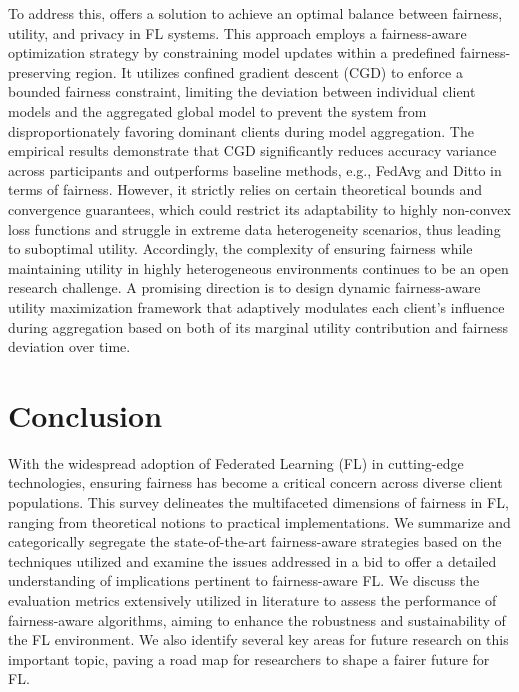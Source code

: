 \documentclass{article}
\begin{document}
To address this, \cite{ACM2024privacy} offers a solution to achieve an optimal balance between fairness, utility, and privacy in FL systems.
This approach employs a fairness-aware optimization strategy by constraining model updates within a predefined fairness-preserving region. It utilizes confined gradient descent (CGD) to enforce a bounded fairness constraint, limiting the deviation between individual client models and the aggregated global model to prevent the system from disproportionately favoring dominant clients during model aggregation. The empirical results demonstrate that CGD significantly reduces accuracy variance across participants and outperforms baseline methods, e.g., 
FedAvg \cite{mcmahan2017communication} and Ditto \cite{li2021dittofairrobustfederated} in terms of fairness. 
However, it strictly relies on certain theoretical bounds and convergence guarantees, which could restrict its adaptability to highly non-convex loss functions and struggle in extreme data heterogeneity scenarios, thus leading to suboptimal utility. Accordingly, the complexity of ensuring fairness while maintaining utility in highly heterogeneous environments continues to be an open research challenge. A promising direction is to design dynamic fairness-aware utility maximization framework that adaptively modulates each client's influence during aggregation based on both of its marginal utility contribution and fairness deviation over time.

\section{Conclusion}
\label{Conclusion}
With the widespread adoption of Federated Learning (FL) in cutting-edge technologies, ensuring fairness has become a critical concern across diverse client populations. This survey delineates the multifaceted dimensions of fairness in FL, ranging from theoretical notions to practical implementations. We summarize and categorically segregate the state-of-the-art fairness-aware strategies based on the techniques utilized and examine the issues addressed in a bid to offer a detailed understanding of implications pertinent to fairness-aware FL. We discuss the evaluation metrics extensively utilized in literature to assess the performance of fairness-aware algorithms, aiming to enhance the robustness and sustainability of the FL environment.
We also identify several key areas for future research on this important topic,  paving a road map for researchers to shape a fairer future for FL.
\end{document}
